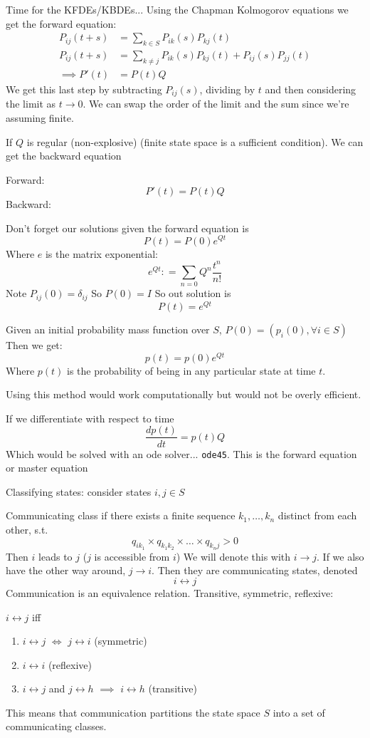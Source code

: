 \documentclass{/home/janmebows/Documents/LatexTemplates/myassignment}
\begin{document}
Time for the KFDEs/KBDEs... Using the Chapman Kolmogorov equations we get the forward equation:
\begin{align*}
P_{ij}(t+s) &= \sum_{k\in S} P_{ik}(s) P_{kj}(t)\\
P_{ij}(t+s)&= \sum_{k\neq j} P_{ik}(s) P_{kj}(t) + P_{ij}(s) P_{jj}(t)\\
\implies P'(t) &= P(t)Q
\end{align*}
We get this last step by subtracting $P_{ij}(s)$, dividing by $t$ and then considering the limit as $t\to 0$. We can swap the order of the limit and the sum since we're assuming finite.


If $Q$ is regular (non-explosive) (finite state space is a sufficient condition). We can get the backward equation

Forward:
\[P'(t) = P(t)Q\]
Backward:
\[\]


Don't forget our solutions given the forward equation is
\[P(t) = P(0) e^{Qt}\]
Where $e$ is the matrix exponential:
\[e^{Qt}: = \sum_{n=0} Q^n \frac{t^n}{n!}\]
Note $P_{ij}(0) = \delta_{ij}$ So $P(0) = I$
So out solution is
\[P(t) = e^{Qt}\]

Given an initial probability mass function over $S$, $P(0) = (p_i(0),\forall i\in S)$ Then we get:
\[p(t) = p(0)e^{Qt}\]
Where $p(t)$ is the probability of being in any particular state at time $t$.

Using this method would work computationally but would not be overly efficient.

If we differentiate with respect to time 
\[\frac{dp(t)}{dt} = p(t) Q\]
Which would be solved with an ode solver... \verb|ode45|. This is the forward equation or master equation


Classifying states: consider states $i,j \in S$ 


Communicating class if there exists a finite sequence $k_1,\hdots,k_n$ distinct from each other, s.t.
\[q_{ik_1} \times q_{k_1k_2} \times \hdots \times q_{k_n j} > 0\]
Then $i$ leads to $j$ ($j$ is accessible from $i$) We will denote this with $i\to j$.
If we also have the other way around, $j\to i$. Then they are communicating states, denoted
\[i\leftrightarrow j\]
Communication is an equivalence relation. Transitive, symmetric, reflexive:

$i\leftrightarrow j$ iff
\begin{enumerate}
    \item $i \leftrightarrow j$ $\Leftrightarrow$ $j\leftrightarrow i$ (symmetric)
    \item $i\leftrightarrow i$ (reflexive)
    \item $i\leftrightarrow j$ and $j\leftrightarrow h$ $\implies$ $i\leftrightarrow h$ (transitive)
\end{enumerate}
This means that communication partitions the state space $S$ into a set of communicating classes.
\end{document}
